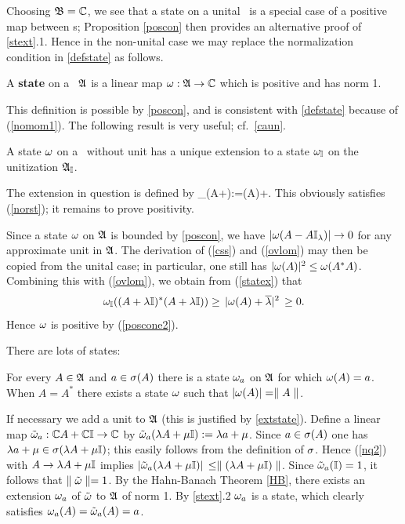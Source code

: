 Choosing ${\frak B}={\Bbb C}$, we see that a state on a unital \ca\ is a special
case of a positive map between \ca s; Proposition \ref{poscon} then
provides an alternative proof of \ref{stext}.1.  Hence in the
non-unital case we may replace the normalization condition in
\ref{defstate} as follows.
\begin{Definition}
A {\bf state} on a \ca\ ${\frak A}$ is a linear map $\omega:{\frak A}\rightarrow{\Bbb C}$ which is
positive and has norm 1. \end{Definition}

This definition is possible by \ref{poscon}, and is consistent with
\ref{defstate} because of (\ref{nomom1}). The following result is very
useful; cf.\ \ref{caun}.
\begin{Proposition}
A state $\omega$ on a \ca\ without unit has a unique extension to a state
$\omega_{{\Bbb I}}$ on the unitization ${\frak A}_{\Bbb I}$. \end{Proposition}

The extension in question is defined by \be
\om_{\I}(A+\lm\I):=\om(A)+\lm.  \ee This obviously
satisfies (\ref{norst}); it remains to prove positivity.

Since a state $\omega$ on ${\frak A}$ is bounded by \ref{poscon}, we have
$|\omega(A-A{\Bbb I}_{\lambda})|\rightarrow 0$ for any approximate unit in ${\frak A}$.  The
derivation of (\ref{css}) and (\ref{ovlom}) may then be copied from
the unital case; in particular, one still has
$|\omega(A)|^2\leq\omega(A^*A)$.  Combining this with (\ref{ovlom}), we
obtain from (\ref{statex}) that
$$
\omega_{{\Bbb I}}((A+\lambda{\Bbb I})^*(A+\lambda{\Bbb I}))\geq\,|\omega(A)+\overline{\lambda}|^2\,\geq 0.
$$
Hence $\omega$ is positive by (\ref{poscone2}).\enp

There are lots of states:
\begin{Lemma}
For every $A\in{\frak A}$ and $a\in\sigma(A)$ there is a state $\omega_a$ on ${\frak A}$
for which $\omega(A)=a$. When $A=A^*$ there exists a state $\omega$ such
that $|\omega(A)|=\parallel A\parallel$.
\end{Lemma}

If necessary we add a unit to ${\frak A}$ (this is justified by
\ref{extstate}).  Define a linear map $\tilde{\omega}_a:{\Bbb C} A+{\Bbb C}{\Bbb I}\rightarrow{\Bbb C}$ by
$\tilde{\omega}_a(\lambda A+\mu{\Bbb I}):=\lambda a+\mu$. Since $a\in\sigma(A)$ one has $\lambda
a+\mu\in\sigma(\lambda A+\mu{\Bbb I})$; this easily follows from the definition of
$\sigma$. Hence (\ref{nq2}) with $A\rightarrow \lambda A+\mu{\Bbb I}$ implies
$|\tilde{\omega}_a(\lambda A+\mu{\Bbb I})|\,\leq \parallel (\lambda A+\mu{\Bbb I})\parallel$. Since
$\tilde{\omega}_a({\Bbb I})=1$, it follows that $\parallel\tilde{\omega}\parallel=1$. By the
Hahn-Banach Theorem \ref{HB}, there exists an extension $\omega_a$ of
$\tilde{\omega}$ to ${\frak A}$ of norm 1.  By \ref{stext}.2 $\omega_a$ is a state,
which clearly satisfies $\omega_a(A)= \tilde{\omega}_a(A)=a$.

